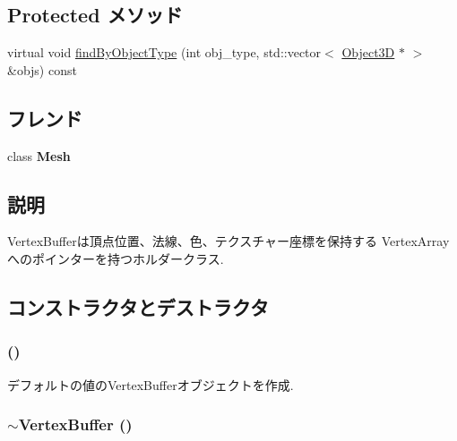 \subsection*{Protected メソッド}
\begin{CompactItemize}
\item 
virtual void \hyperlink{classm3g_1_1VertexBuffer_4dadb21b568b0230fac106f15040138c}{findByObjectType} (int obj\_\-type, std::vector$<$ \hyperlink{classm3g_1_1Object3D}{Object3D} $\ast$ $>$ \&objs) const 
\end{CompactItemize}
\subsection*{フレンド}
\begin{CompactItemize}
\item 
\hypertarget{classm3g_1_1VertexBuffer_a41a130f156b145bffb3f4b5172c4c93}{
class \textbf{Mesh}}
\label{classm3g_1_1VertexBuffer_a41a130f156b145bffb3f4b5172c4c93}

\end{CompactItemize}


\subsection{説明}
VertexBufferは頂点位置、法線、色、テクスチャー座標を保持する VertexArrayへのポインターを持つホルダークラス. 

\subsection{コンストラクタとデストラクタ}
\hypertarget{classm3g_1_1VertexBuffer_fd7b13840c99c57d27316c8f8434dc49}{
\subsubsection[{VertexBuffer}]{ ()}}
\label{classm3g_1_1VertexBuffer_fd7b13840c99c57d27316c8f8434dc49}


デフォルトの値のVertexBufferオブジェクトを作成. \hypertarget{classm3g_1_1VertexBuffer_0e5e1dbdc4295ff9aa1e15e0ce3624af}{
\subsubsection[{$\sim$VertexBuffer}]{\setlength{\rightskip}{0pt plus 5cm}$\sim${\bf VertexBuffer} ()}}
\label{classm3g_1_1VertexBuffer_0e5e1dbdc4295ff9aa1e15e0ce3624af}


